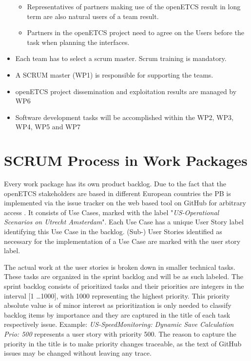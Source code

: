 \begin{itemize}
\begin{itemize}
		\item Representatives of partners making use of the openETCS result in long term are also natural users of a team result.
		\item Partners in the openETCS project need to agree on the Users before the task when planning the interfaces. 
	\end{itemize}  
	\item Each team has to select a scrum master. Scrum training is mandatory.
	\item A SCRUM master (WP1) is responsible for supporting the teams.
	\item openETCS project dissemination and exploitation results are managed by WP6
	\item Software development tasks will be accomplished within the WP2, WP3, WP4, WP5 and WP7  
\end{itemize}

 


\section{SCRUM Process in Work Packages}


Every work package has its own product backlog. Due to the fact that the openETCS stakeholders are based in different European countries the PB is implemented via the issue tracker on the web based tool on GitHub for arbitrary access . It consists of Use Cases, marked with the label "\textit{US-Operational Scenarios on Utrecht Amsterdam}". Each Use Case has a unique User Story label identifying this Use Case in the backlog. (Sub-) User Stories identified as necessary for the implementation of a Use Case are marked with the user story label.

The actual work at the user stories is broken down in smaller technical tasks. These tasks are organized in the sprint backlog and will be as such labeled. The sprint backlog consists of prioritized tasks and their priorities are integers in the interval [1 \dots 1000], with 1000 representing the highest priority. This priority absolute value is of minor interest as prioritization is only needed to classify backlog items by importance and they are captured in the title of each task respectively issue. Example: \textit{US-SpeedMonitoring: Dynamic Save Calculation Prio: 500} represents a user story with priority 500. The reason to capture the priority in the title is to make priority changes traceable, as the text of GitHub issues may be changed without leaving any trace.

